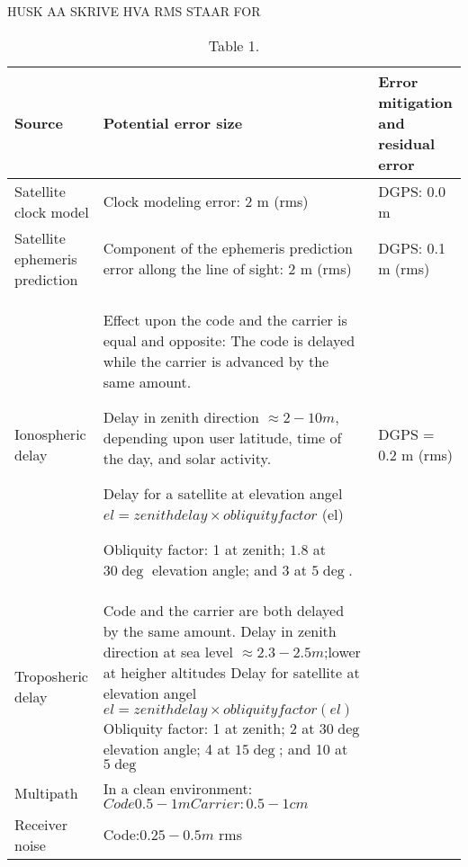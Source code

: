 HUSK AA SKRIVE HVA RMS STAAR FOR
\begin{table}[!h]
\begin{center}
    \begin{tabular}{ | l | l | l |}
    \hline
    \textbf{Source} & \textbf{Potential error size} & \textbf{Error mitigation and residual error} \\ \hline
     Satellite clock model & Clock modeling error: 2 m (rms) & DGPS: 0.0 m \\ \hline
     Satellite ephemeris prediction & Component of the ephemeris prediction error allong the line of sight: 2 m (rms) & DGPS: 0.1 m (rms) \\ \hline
     Ionospheric delay & Effect upon the code and the carrier is equal and opposite: The code is delayed while the carrier is advanced by the same amount.
     
     Delay in zenith direction $\approx 2-10 m $, depending upon user latitude, time of the day, and solar activity.
     
     Delay for a satellite at elevation angel $el = zenith delay \times obliquity factor$ (el)
     
     Obliquity factor: 1 at zenith; $1.8$ at $30\deg$ elevation angle; and 3 at $5\deg$. & DGPS = 0.2 m (rms) \\ \hline
     Troposheric delay & Code and the carrier are both delayed by the same amount. Delay in zenith direction at sea level $\approx 2.3-2.5 m$;lower at heigher altitudes Delay for satellite at elevation angel $el = zenith delay \times obliquity factor (el)$ Obliquity factor: 1 at zenith; 2 at $30\deg$ elevation angle; 4 at $15\deg$; and 10 at $5\deg$ \\ \hline
     Multipath & In a clean environment: $Code 0.5-1 m Carrier: 0.5-1 cm$ \\ \hline
     Receiver noise & Code:$0.25-0.5 m$ rms \\ \hline
    \end{tabular}
\end{center}
\caption{Table 1. }
\label{Tab1}
\end{table}